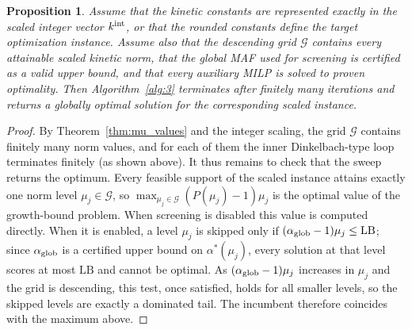 \documentclass[a4paper,11pt,reqno]{amsart}
\newtheorem{proposition}[definition]{Proposition}
\begin{document}
\begin{proposition}
\label{prop:exactitud}
Assume that the kinetic constants are represented exactly in the scaled integer
vector $k^{\rm int}$, or that the rounded constants define the target
optimization instance. Assume also that the descending grid $\mathcal G$
contains every attainable scaled kinetic norm, that the global MAF used for
screening is certified as a valid upper bound, and that every auxiliary MILP is
solved to proven optimality. Then Algorithm~\ref{alg:3} terminates after
finitely many iterations and returns a globally optimal solution for the
corresponding scaled instance.
\end{proposition}
\begin{proof}
By Theorem~\ref{thm:mu_values} and the integer scaling, the grid $\mathcal G$
contains finitely many norm values, and for each of them the inner
Dinkelbach-type loop terminates finitely (as shown above). It thus remains to
check that the sweep returns the optimum. Every feasible support of the scaled
instance attains exactly one norm level $\mu_j\in\mathcal G$, so
$\max_{\mu_j\in\mathcal G}(P(\mu_j)-1)\mu_j$ is the optimal value of the
growth-bound problem. When screening is disabled this value is computed
directly. When it is enabled, a level $\mu_j$ is skipped only if
$(\alpha_{\rm glob}-1)\mu_j\le\mathrm{LB}$; since $\alpha_{\rm glob}$ is a
certified upper bound on $\alpha^*(\mu_j)$, every solution at that level scores
at most $\mathrm{LB}$ and cannot be optimal. As $(\alpha_{\rm glob}-1)\mu_j$
increases in $\mu_j$ and the grid is descending, this test, once satisfied,
holds for all smaller levels, so the skipped levels are exactly a dominated
tail. The incumbent therefore coincides with the maximum above.
\end{proof}
\end{document}
